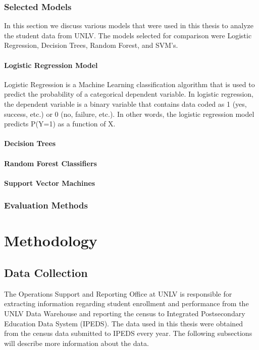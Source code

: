 \documentclass[11pt,openright]{report}
\begin{document}
\subsection{Selected Models}

In this section we discuss various models that were used in this thesis to analyze the student data from UNLV. The models selected for comparison were Logistic Regression, Decision Trees, Random Forest, and SVM's.

\subsubsection {Logistic Regression Model}

Logistic Regression is a Machine Learning classification algorithm that is used to predict the probability of a categorical dependent variable. In logistic regression, the dependent variable is a binary variable that contains data coded as 1 (yes, success, etc.) or 0 (no, failure, etc.). In other words, the logistic regression model predicts P(Y=1) as a function of X.

\subsubsection {Decision Trees}

\subsubsection {Random Forest Classifiers}

\subsubsection {Support Vector Machines }

\subsection {Evaluation Methods}

\chapter{Methodology} \label{chapter:methodology}

\section{Data Collection}

The Operations Support and Reporting Office at UNLV is responsible for extracting information regarding student enrollment and performance from the UNLV Data Warehouse and reporting the census to Integrated Postsecondary Education Data System (IPEDS). The data used in this thesis were obtained from the census data submitted to IPEDS every year. The following subsections will describe more information about the data.
\end{document}
